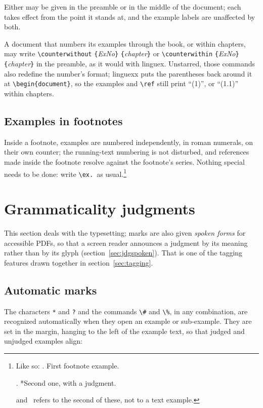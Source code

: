 \documentclass[11pt,a4paper]{article}
\newcommand{\cs}[1]{\texttt{\textbackslash #1}}
\newcommand{\pkg}[2][]{\textsf{#2}}
\newcommand{\meta}[1]{\textrm{\itshape\textlangle#1\textrangle}}
\newcommand{\marg}[1]{\penalty300 \texttt{\{}\meta{#1}\texttt{\}}}
\begin{document}
\noindent Either may be given in the preamble or in the middle of the
document; each takes effect from the point it stands at, and the example
labels are unaffected by both.

A document that numbers its examples through the book, or within chapters,
may write \cs{counterwithout}\marg{ExNo}\marg{chapter} or
\cs{counterwithin}\marg{ExNo}\marg{chapter} in the preamble, as it would
with \pkg{linguex}. Unstarred, those commands also redefine the number's
format; linguexx puts the parentheses back around it at
\verb|\begin{document}|, so the examples and \cs{ref} still print ``(1)'',
or ``(1.1)'' within chapters.

\subsection{Examples in footnotes}

Inside a footnote, examples are numbered independently, in roman numerals,
on their own counter; the running-text numbering is not disturbed, and
references made inside the footnote resolve against the footnote's series.
Nothing special needs to be done: write \cs{ex.}\ as usual.\footnote{Like
so:
\ex. First footnote example.

\ex. *Second one, with a judgment.

and \Last\ refers to the second of these, not to a text example.}

\section{Grammaticality judgments}\label{sec:judgments}

This section deals with the typesetting; marks are also given
\emph{spoken forms} for accessible PDFs, so that a screen reader
announces a judgment by its meaning rather than by its glyph
(section~\ref{sec:jdgspoken}). That is one of the tagging features
drawn together in section~\ref{sec:tagging}.

\subsection{Automatic marks}

The characters \texttt{*} and \texttt{?} and the commands \cs{\#} and
\cs{\%}, in any combination, are recognized automatically when they open an
example or sub-example. They are set in the margin, hanging to the left of
the example text, so that judged and unjudged examples align:
\end{document}
